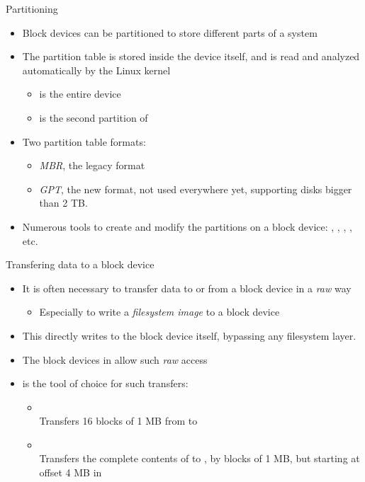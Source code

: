 \begin{frame}{Partitioning}
  \begin{itemize}
  \item Block devices can be partitioned to store different parts of a
    system
  \item The partition table is stored inside the device itself, and is
    read and analyzed automatically by the Linux kernel
    \begin{itemize}
    \item {} is the entire device
    \item {} is the second partition of 
    \end{itemize}
  \item Two partition table formats:
    \begin{itemize}
    \item {\em MBR}, the legacy format
    \item {\em GPT}, the new format, not used everywhere yet, supporting
      disks bigger than 2 TB.
    \end{itemize}
  \item Numerous tools to create and modify the partitions on a block
    device: , , , ,
    etc.
  \end{itemize}
\end{frame}

\begin{frame}{Transfering data to a block device}
  \begin{itemize}
  \item It is often necessary to transfer data to or from a block
    device in a {\em raw} way
    \begin{itemize}
    \item Especially to write a {\em filesystem image} to a block
      device
    \end{itemize}
  \item This directly writes to the block device itself, bypassing any
    filesystem layer.
  \item The block devices in  allow such {\em raw} access
  \item {} is the tool of choice for such transfers:
    \begin{itemize}
    \item {}\\
      Transfers 16 blocks of 1 MB from  to
    \item {}\\
      Transfers the complete contents of  to
      , by blocks of 1 MB, but starting at offset 4 MB
      in 
    \end{itemize}
  \end{itemize}
\end{frame}


